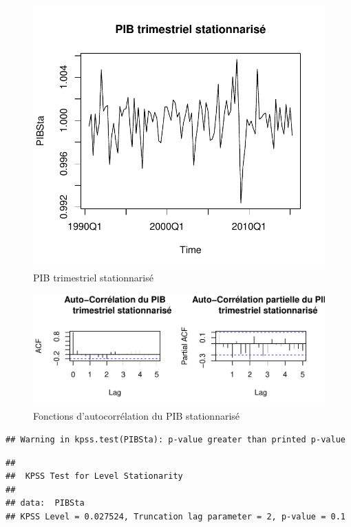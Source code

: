 \documentclass[11pt,]{article}
\begin{document}
\begin{figure}[htbp]
\centering
\includegraphics{doc_files/figure-latex/unnamed-chunk-15-1.pdf}
\caption{\label{fig13} PIB trimestriel stationnarisé}
\end{figure}

\begin{figure}[htbp]
\centering
\includegraphics{doc_files/figure-latex/unnamed-chunk-16-1.pdf}
\caption{\label{fig14} Fonctions d'autocorrélation du PIB stationnarisé}
\end{figure}

\begin{verbatim}
## Warning in kpss.test(PIBSta): p-value greater than printed p-value
\end{verbatim}

\begin{verbatim}
## 
##  KPSS Test for Level Stationarity
## 
## data:  PIBSta
## KPSS Level = 0.027524, Truncation lag parameter = 2, p-value = 0.1
\end{verbatim}
\end{document}
